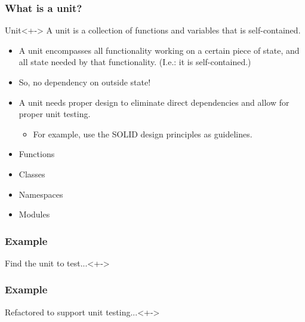 \begin{frame}
	\frametitle{What is a unit?}
	\begin{block}{Unit}<+->
		A unit is a collection of functions and variables that is \alert{self-contained}.
	\end{block}

	\begin{itemize}[<+-| highlight@+>]
		\item A unit encompasses \alert{all functionality} working on a certain piece of state, \alert{and} \alert{all state} needed by that functionality. (I.e.: it is self-contained.)
		\item So, no dependency on outside state!
		\item A unit needs proper design to eliminate direct dependencies and allow for proper unit testing.
		\begin{itemize}[<+-| highlight@+>]
			\item For example, use the SOLID design principles as guidelines.
		\end{itemize}
	\end{itemize}
\end{frame}


\begin{frame}
	\begin{itemize}[<+-| highlight@+>]
		\item Functions
		\item Classes
		\item Namespaces
		\item Modules
	\end{itemize}
\end{frame}


\begin{frame}
	\frametitle{Example}
	\begin{block}{Find the unit to test...}<+->
		
	\end{block}
\end{frame}


\begin{frame}
	\frametitle{Example}
	\begin{block}{Refactored to support unit testing...}<+->
		
	\end{block}
\end{frame}


